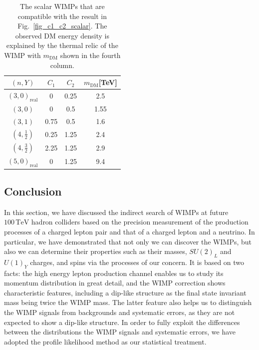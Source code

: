 \documentclass[12pt,twoside,book]{article}
\begin{document}
\begin{table}[t]
  \centering
  \begin{tabular}{|c|ccc|}
    \hline
    $(n, Y)$           & $C_1$ & $C_2$ & $m_\text{DM}$[TeV] \\ \hline\hline
    $(3,0)_\text{real}$  &    0  &  0.25  & 2.5 \cite{Farina:2013mla}             \\
    $(3,          0)$  &    0  & 0.5   & 1.55 \cite{DelNobile:2015bqo}              \\
    $(3,          1)$  & 0.75  & 0.5   & 1.6 \cite{Farina:2013mla}               \\
    $(4,\frac{1}{2})$  & 0.25  & 1.25  & 2.4 \cite{Farina:2013mla}             \\
    $(4,\frac{3}{2})$  & 2.25  & 1.25  & 2.9 \cite{Farina:2013mla}             \\
    $(5,0)_\text{real}$  &    0  &  1.25  & 9.4 \cite{Farina:2013mla}          \\
    \hline
  \end{tabular}
  \caption{
    The scalar WIMPs that are compatible with the result in Fig.~\ref{fig_c1_c2_scalar}. The observed DM energy density is explained by the thermal relic of the WIMP with $m_{\text{DM}}$ shown in the fourth column.
  }
  \label{tab:minimalDM-for-950scalar-section}
\end{table}


\subsection{Conclusion}
\label{seq:conclusion}

In this section, we have discussed the indirect search of WIMPs at future $100\,\mathrm{TeV}$ hadron colliders based on the precision measurement of the production processes of a charged lepton pair and that of a charged lepton and a neutrino.
In particular, we have demonstrated that not only we can discover the WIMPs, but also we can determine their properties such as their masses, $SU(2)_L$ and $U(1)_Y$ charges, and  spins via the processes of our concern.
It is based on two facts: the high energy lepton production channel enables us to study its momentum distribution in great detail, and the WIMP correction shows characteristic features, including a dip-like structure as the final state invariant mass being twice the WIMP mass.
The latter feature also helps us to distinguish the WIMP signals from backgrounds and systematic errors, as they are not expected to show a dip-like structure.
In order to fully exploit the differences between the distributions the WIMP signals and systematic errors, we have adopted the profile likelihood method as our statistical treatment.
\end{document}
